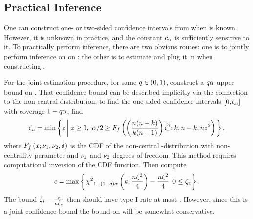 \documentclass[10pt,a4paper,english]{article}
\theoremstyle{plain}
\theoremstyle{definition}
\theoremstyle{remark}
\providecommand{\cono}[1][\typeI]{\mathSUB{c}{#1}}
\begin{document}

\subsection{Practical Inference}

One can construct one- or two-sided confidence intervals from  when \psnropt is known.
However, it is unknown in practice, and the constant $\cono[\typeI]$ is sufficiently sensitive to it.
To practically perform inference, there are two obvious routes: one is to
jointly perform inference on \psnropt on \psnr[a]; 
the other is to estimate \psnropt and plug it in when constructing \cono[\typeI].

For the joint estimation procedure, for some $q \in \left(0,1\right)$,
construct a $q \alpha$ upper bound on \psnropt.
That confidence bound can be described implicitly via the connection 
to the non-central \flaw{} distribution:
to find the one-sided confidence intervals $\ccinterval{0}{\psnr[u]}$ with
coverage $1-q\alpha$, find
\begin{equation}
\psnr[u] = \min \setwo{z}{z \ge 0,\,\,\typeI/2 \ge \ncfcdf{\wrapNeParens{\frac{\ssiz (\ssiz-\nstrat)}{\nstrat (\ssiz - 1)}}\ssrsqopt}{\nstrat,\ssiz - \nstrat}{\ssiz z^2}},
\end{equation}
where $\ncfcdf{x}{\nctdf[1],\nctdf[2]}{\ncfp}$ is the CDF of the non-central
\flaw{}-distribution with 
non-centrality parameter \ncfp and $\nctdf[1]$ and $\nctdf[2]$ degrees of freedom.
This method requires computational inversion of the CDF function. 
Then compute
$$
c = \max \wrapBraces{\left. \chisqqnt{1-\wrapNeParens{1-q}\typeI}{\nstrat,
\frac{\ssiz\psnr^2}{4}} - \frac{\ssiz\psnr^2}{4} \right|  0 \le \psnr[u]}.
$$
The bound $\ssropt - \frac{c}{\ssiz\ssropt}$ then should
have type I rate at most \typeI.
However, since this is a joint confidence bound the bound on \psnr[a] will be
somewhat conservative.
\end{document}
